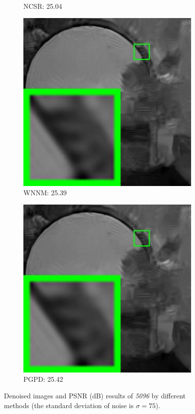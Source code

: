 \begin{figure}
\begin{subfigure}[t]{0.24\textwidth}
		\caption{NCSR: 25.04}
    \end{subfigure}
    \hfill
    \begin{subfigure}[t]{0.24\textwidth}
        \centering
        \includegraphics[width=1\textwidth]{images/pgpd/200img/br_our_75_5096.jpg}
		\caption{WNNM: 25.39}
    \end{subfigure}
    \hfill
    \begin{subfigure}[t]{0.24\textwidth}
        \centering
        \includegraphics[width=1\textwidth]{images/pgpd/200img/br_our_75_5096.jpg}
		\caption{PGPD: 25.42}
    \end{subfigure}
    \caption{Denoised images and PSNR (dB) results of \textsl{5096} by different methods (the standard deviation of noise is $\sigma=75$).}
    \label{fig2-17}
\end{figure}


